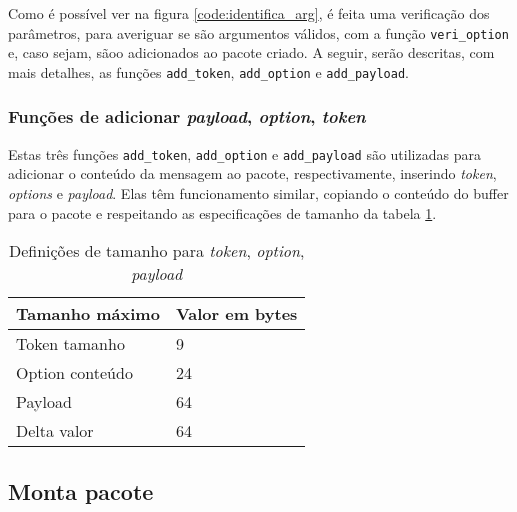 Como é possível ver na figura \ref{code:identifica_arg}, é feita uma verificação dos parâmetros, para averiguar se são argumentos válidos, com a função \texttt{veri\_option} e, caso sejam, sãoo adicionados ao pacote criado. A seguir, serão descritas, com mais detalhes, as funções \texttt{add\_token}, \texttt{add\_option} e \texttt{add\_payload}. 

\subsubsection{Funções de adicionar \textit{payload}, \textit{option}, \textit{token}}

Estas três funções \texttt{add\_token}, \texttt{add\_option} e \texttt{add\_payload} são utilizadas para adicionar o conteúdo da mensagem ao pacote, respectivamente, inserindo \textit{token}, \textit{options} e \textit{payload}. Elas têm funcionamento similar, copiando o conteúdo do buffer para o pacote e respeitando as especificações de tamanho da tabela \ref{table:valores_token_option_payload}.

\begin{table}[!htb]
	\centering
	\caption{Definições de tamanho para \textit{token}, \textit{option}, \textit{payload}}
	\label{table:valores_token_option_payload}
	\begin{tabular}{l|l}
		Tamanho máximo  & Valor em bytes \\ \hline
		Token tamanho   & 9              \\ \hline
		Option conteúdo & 24             \\ \hline
		Payload         & 64             \\ \hline
		Delta valor     & 64            
	\end{tabular}
\end{table}

\subsection{Monta pacote}


